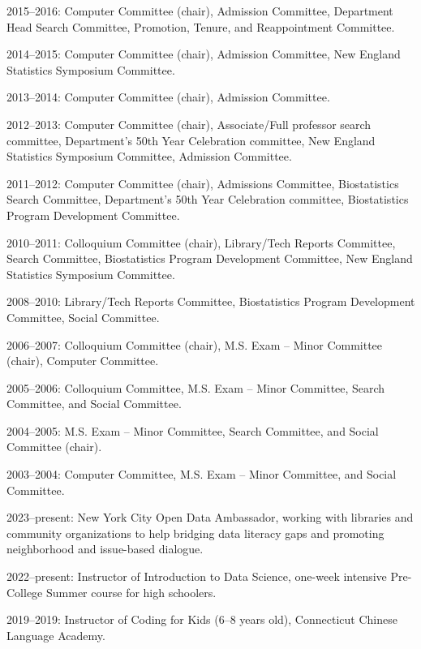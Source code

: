 \documentclass[Statistics]{vita}
\begin{document}
\begin{vita}
\begin{Services}
\begin{DepartmentalService}
  \item 2015--2016: Computer Committee (chair), Admission Committee, Department Head Search Committee, Promotion, Tenure, and Reappointment Committee.
  \item 2014--2015: Computer Committee (chair), Admission Committee, New England Statistics Symposium Committee.
  \item 2013--2014: Computer Committee (chair), Admission Committee.
  \item 2012--2013: Computer Committee (chair), Associate/Full professor search committee, Department's 50th Year Celebration committee, New England Statistics Symposium Committee, Admission Committee.
  \item 2011--2012: Computer Committee (chair), Admissions Committee, Biostatistics Search Committee,  Department's 50th Year Celebration committee, Biostatistics Program Development Committee.
  \item 2010--2011: Colloquium Committee (chair), Library/Tech Reports Committee, Search Committee, Biostatistics Program Development Committee, New England Statistics Symposium Committee.
  \item 2008--2010: Library/Tech Reports Committee, Biostatistics Program Development Committee, Social Committee.
  \item 2006--2007: Colloquium Committee (chair), M.S. Exam -- Minor Committee (chair), Computer Committee.
  \item 2005--2006: Colloquium Committee, M.S. Exam -- Minor Committee, Search Committee, and Social Committee.
  \item 2004--2005: M.S. Exam -- Minor Committee, Search Committee, and Social Committee (chair).
  \item 2003--2004: Computer Committee, M.S. Exam -- Minor Committee, and Social Committee.
  \end{DepartmentalService}
  \begin{Outreaches}
  \item 2023--present: New York City Open Data Ambassador, working with libraries and community organizations to help bridging data literacy gaps and promoting neighborhood and issue-based dialogue.
  \item 2022--present: Instructor of Introduction to Data Science, one-week intensive Pre-College Summer course for high schoolers.
  \item 2019--2019: Instructor of Coding for Kids (6--8 years old), Connecticut  Chinese Language Academy.
  \end{Outreaches}

\end{Services}
\end{vita}
\end{document}
